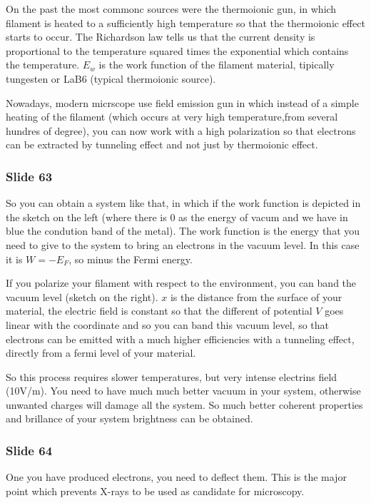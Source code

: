 \documentclass[../main/main.tex]{subfiles}
\begin{document}
On the past the most commonc sources were the thermoionic gun, in which filament is heated to a sufficiently high temperature so that the thermoionic effect starts to occur. The Richardson law tells us that the current density is proportional to the temperature squared times the exponential which contains the temperature. \( E_w \) is the work function of the filament material, tipically tungesten or LaB6 (typical thermoionic source).

Nowadays, modern micrscope use field emission gun in which instead of a simple heating of the filament (which occurs at very high temperature,from several hundres of degree), you can now work with a high polarization so that electrons can be extracted by tunneling effect and not just by thermoionic effect.


\subsubsection{Slide 63}

So you can obtain a system like that, in which if the work function is depicted in the sketch on the left (where there is 0 as the energy of vacum and we have in blue the condution band of the metal). The work function is the energy that you need to give to the system to bring an electrons in the vacuum level.
In this case it is \( W=-E_F \), so minus the Fermi energy.


If you polarize your filament with respect to the environment, you can band the vacuum level (sketch on the right). \( x \) is the distance from the surface of your material, the electric field is constant so that the different of potential \( V \) goes linear with the coordinate and so you can band this vacuum level, so that electrons can be emitted with a much higher efficiencies with a tunneling effect, directly from a fermi level of your material.

So this process requires slower temperatures, but very intense electrins field (10V/m).
You need to have much much better vacuum in your system, otherwise unwanted charges will damage all the system.
So much better coherent properties and brillance of your system brightness can be obtained.

\subsubsection{Slide 64}
One you have produced electrons, you need to deflect them. This is the major point which prevents X-rays to be used as candidate for microscopy.
\end{document}
